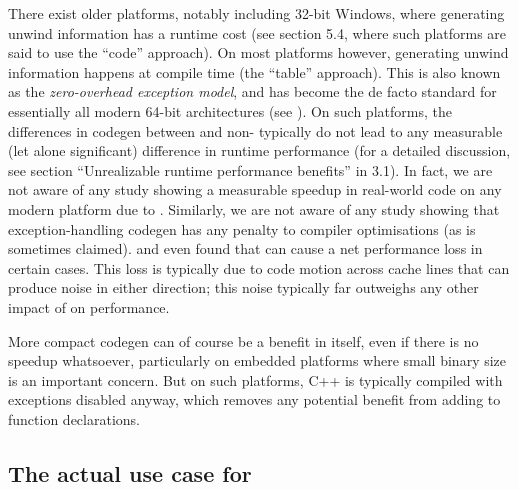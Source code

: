 There exist older platforms, notably including 32-bit Windows, where generating unwind information has a runtime cost (see \cite{TR18015} section 5.4, where such platforms are said to use the ``code'' approach). On most platforms however, generating unwind information happens at compile time (the ``table'' approach). This is also known as the \emph{zero-overhead exception model}, and has become the de facto standard for essentially all modern 64-bit architectures (see \cite{Mortoray2013}). On such platforms, the differences in codegen between  and non- typically do not lead to any measurable (let alone significant) difference in runtime performance (for a detailed discussion, see section ``Unrealizable runtime performance benefits'' in \cite{EMC++S} 3.1). In fact, we are not aware of any study showing a measurable speedup in real-world code on any modern platform due to . Similarly, we are not aware of any study showing that exception-handling codegen has any penalty to compiler optimisations (as is sometimes claimed). \cite{Mahaffey2017} and \cite{Dekker2019} even found that  can cause a net performance loss in certain cases. This loss is typically due to code motion across cache lines that can produce noise in either direction; this noise typically far outweighs any other impact of  on performance.

More compact codegen can of course be a benefit in itself, even if there is no speedup whatsoever, particularly on embedded platforms where small binary size is an important concern. But on such platforms, C++ is typically compiled with exceptions disabled anyway, which removes any potential benefit from adding  to function declarations.

\subsection{The actual use case for }

